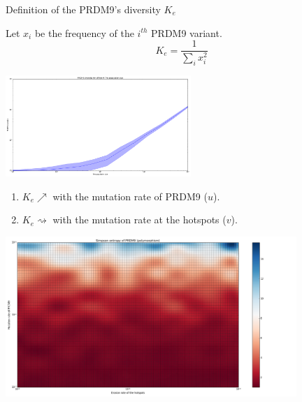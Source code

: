 \documentclass[10pt]{beamer}
\begin{document}
\begin{frame}
	\begin{center}
		\Large
    	Definition of the PRDM9's diversity $K_e$ 
    \end{center}
	Let $x_i$ be the frequency of the $i^{th}$ PRDM9 variant.\\

    \[ K_e = \dfrac{1}{\displaystyle \sum_i x_i^2}   \]
	\begin{center}
       \includegraphics[width=7cm]{Images/ne-diversity.png}
	\end{center}
\end{frame}

\begin{frame}
	\begin{center}
		\begin{enumerate}
		\item $K_e \nearrow$ with the mutation rate of PRDM9 ($u$).
		
		\item $K_e \rightsquigarrow$ with the mutation rate at the hotspots ($v$).
		\end{enumerate}
       \includegraphics[width=11cm]{Images/simpson-entropy-mutation-erosion.png}
	\end{center}
\end{frame}
\end{document}
